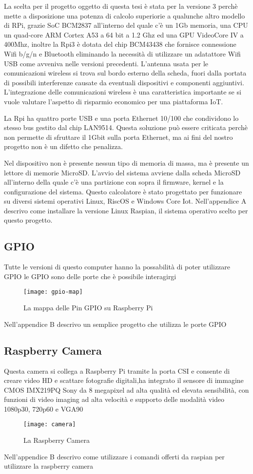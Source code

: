 La scelta per il progetto oggetto di questa tesi è stata per la versione 3  perchè mette a disposizione una potenza di calcolo superiorie a qualunche altro modello di RPi, grazie SoC BCM2837 all'interno del quale c'è  un 1Gb memoria, una CPU un quad-core ARM Cortex A53 a 64 bit a 1.2 Ghz ed una GPU VideoCore IV a 400Mhz, inoltre la Rpi3 è dotata del chip BCM43438 che fornisce connessione Wifi b/g/n e Bluetooth eliminando la necessità di utilizzare  un adatattore Wifi USB come avveniva nelle versioni precedenti.
L'antenna usata per le comunicazioni wireless si  trova sul bordo esterno della scheda, fuori dalla portata di possibili interferenze causate  da eventuali dispositivi e componenti aggiuntivi. L'integrazione delle comunicazioni wireless è una caratteristica importante se si vuole valutare l'aspetto di risparmio economico per una piattaforma IoT.

La Rpi ha quattro porte USB e una porta Ethernet 10/100 che condividono lo stesso bus gestito dal chip LAN9514. Questa soluzione può essere criticata  perchè non permette di sfruttare il 1Gbit sulla porta Ethernet, ma ai fini del nostro progetto non è un difetto che penalizza.


Nel dispositivo non è presente nessun tipo di memoria di massa, ma è presente un lettore di memorie MicroSD.
L'avvio del sistema avviene dalla scheda MicroSD all'interno della quale c'è una partizione con sopra il firmware, kernel e la configurazione del sistema.
Questo calcolatore è stato progettato per funzionare su diversi sistemi operativi Linux, RiscOS e Windows Core Iot.
Nell'appendice A descrivo come installare la versione Linux Raspian, il sistema operativo scelto per questo progetto.

\subsection{GPIO}
Tutte le versioni di questo computer hanno la possabilità di poter utilizzare GPIO  le GPIO sono delle porte che è possibile interagirgi
\begin{figure}[htbp!] 
	\centering    
	\texttt{[image: gpio-map]}
	\caption[Mappa GPIO]{La mappa delle Pin GPIO su Raspberry Pi}
	\label{fig:gpio-map}
\end{figure}
Nell'appendice B descrivo un semplice progetto che utilizza le porte GPIO

\subsection{Raspberry Camera}
Questa camera si collega a Raspberry Pi tramite la porta CSI e consente di creare video HD e scattare fotografie digitali,ha integrato il sensore di immagine CMOS IMX219PQ Sony da 8 megapixel ad alta qualità ed elevata sensibilità, con funzioni di video imaging ad alta velocità e supporto delle modalità video 1080p30, 720p60 e VGA90
\begin{figure}[htbp!] 
	\centering    
	\texttt{[image: camera]}
	\caption[Raspberry Camera]{La Raspberry Camera}
	\label{fig:camera}
\end{figure}
Nell'appendice B descrivo come utilizzare i comandi offerti da raspian per utilizzare la raspberry camera

